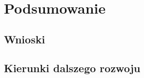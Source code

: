 \chapter{Podsumowanie}
\label{ch:podsumowanie}

\section{Wnioski}
\label{sec:wnioski}


\section{Kierunki dalszego rozwoju}
\label{sec:rozwoj}

